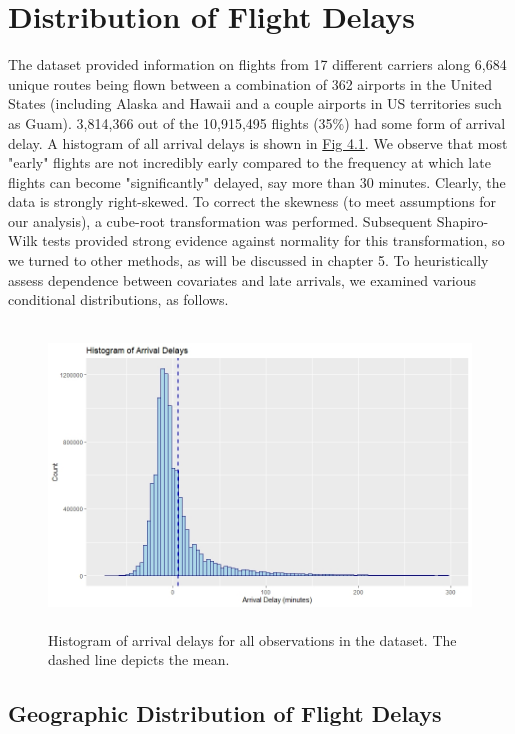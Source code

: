 \documentclass[12pt, a4paper, openany]{book}
\newcommand\tab[1][1cm]{\hspace*{#1}}
\begin{document}
	\section{Distribution of Flight Delays}
	\tab The dataset provided information on flights from 17 different carriers along 6,684 unique routes being flown between a combination of 362 airports in the United States (including Alaska and Hawaii and a couple airports in US territories such as Guam). 3,814,366 out of the 10,915,495 flights (35\%) had some form of arrival delay. A histogram of all arrival delays is shown in \underline{Fig 4.1}. We observe that most "early" flights are not incredibly early compared to the frequency at which late flights can become "significantly" delayed, say more than 30 minutes. Clearly, the data is strongly right-skewed. To correct the skewness (to meet assumptions for our analysis), a cube-root transformation was performed. Subsequent Shapiro-Wilk tests provided strong evidence against normality for this transformation, so we turned to other methods, as will be discussed in chapter 5. To heuristically assess dependence between covariates and late arrivals, we examined various conditional distributions, as follows.\\
	\begin{figure}
	\centering
	 \includegraphics[width = .5 \textwidth, height = 8cm]{../figures/PLOTS FOR REPORT/Chapter 4/Figure 4.1}
	 \caption{Histogram of arrival delays for all observations in the dataset. The dashed line depicts the mean.}
	 \end{figure}
		\subsection{Geographic Distribution of Flight Delays}
		
\end{document}
